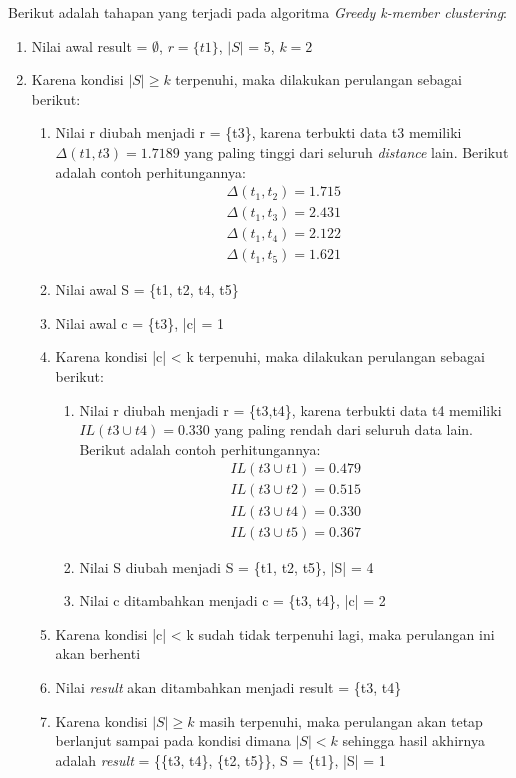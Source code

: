 \noindent Berikut adalah tahapan yang terjadi pada algoritma \textit{Greedy k-member clustering}:

\begin{enumerate}
\item Nilai awal result = $\emptyset$, $r = \{t1\}$, $|S|$ = 5, $k = 2$
\item Karena kondisi $|S| \geq k$ terpenuhi, maka dilakukan perulangan sebagai berikut:
\begin{enumerate}
\item Nilai r diubah menjadi r = \{t3\}, karena terbukti data t3 memiliki $\Delta(t1,t3)=1.7189$ yang paling tinggi dari seluruh \textit{distance} lain. Berikut adalah contoh perhitungannya:
\begin{align*}
\Delta (t_1,t_2) = 1.715\\
\Delta (t_1,t_3) = 2.431\\
\Delta (t_1,t_4) = 2.122\\
\Delta (t_1,t_5) = 1.621 
\end{align*}
\item Nilai awal S = \{t1, t2, t4, t5\}
\item Nilai awal c = \{t3\}, |c| = 1
\item Karena kondisi |c| < k terpenuhi, maka dilakukan perulangan sebagai berikut:

\begin{enumerate}
\item Nilai r diubah menjadi r = \{t3,t4\}, karena terbukti data t4 memiliki $IL(t3 \cup t4)=0.330$ yang paling rendah dari seluruh data lain. Berikut adalah contoh perhitungannya:
\begin{align*}
IL(t3 \cup t1) = 0.479 \\
IL(t3 \cup t2) = 0.515 \\
IL(t3 \cup t4) = 0.330 \\
IL(t3 \cup t5) = 0.367 
\end{align*}
\item Nilai S diubah menjadi S = \{t1, t2, t5\}, |S| = 4
\item Nilai c ditambahkan menjadi c = \{t3, t4\}, |c| = 2

\end{enumerate}
\item Karena kondisi |c| < k sudah tidak terpenuhi lagi, maka perulangan ini akan berhenti
\item Nilai \textit{result} akan ditambahkan menjadi result = \{t3, t4\}
\item Karena kondisi $|S| \geq k$ masih terpenuhi, maka perulangan akan tetap berlanjut sampai pada kondisi dimana $|S| < k$ sehingga hasil akhirnya adalah \textit{result} = \{\{t3, t4\}, \{t2, t5\}\}, S = \{t1\}, |S| = 1


\end{enumerate}
\end{enumerate}
